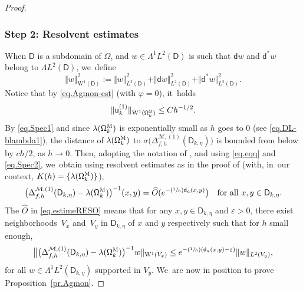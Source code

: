 \documentclass[JEP,XML,SOM,Unicode,NoEqCountersInSection,NoFloatCountersInSection,published]{cedram}
\newcommand{\Psfrac}[2]{(\sfrac{#1}{#2})}
\let\epsilon\varepsilon
\theoremstyle{plain}
\theoremstyle{definition}
\begin{document}
\begin{proof}
\subsubsection*{Step 2: Resolvent estimates}
When $\mathsf D$ is a subdomain of $\Omega$, and $w\in \Lambda^1L^2(\mathsf D)$ is such that $ \mathsf d w$ and $\mathsf d^* w$ belong to $\Lambda L^2(\mathsf D)$, we~define
\begin{equation}\label{eq.norm1}
\Vert w\Vert _{\mathrm W^1(\mathsf D)}^2:= \Vert w\Vert _{L^2(\mathsf D)}^2+\Vert \mathsf dw\Vert _{L^2(\mathsf D)}^2+\Vert \mathsf d^*w\Vert _{L^2(\mathsf D)}^2.
\end{equation}
Notice that by \eqref{eq.Agmon-est} (with $\varphi=0$), it~holds
\begin{equation}\label{eq.estimeW1}
\Vert \mathsf u^{(1)}_k \Vert _{\mathrm W^1(\mathsf \Omega_k^{\textsc{M}})}\le Ch^{-1/2}.
\end{equation}
By \eqref{eq.Spec1} and since $\lambda(\mathsf \Omega_k^{\textsc{M}})$ is exponentially small as $h$ goes to $0$ (see \eqref{eq.DL-blambda1}), the distance of $\lambda(\mathsf \Omega_k^{\textsc{M}})$ to $\sigma \bigl(\Delta_{f,h}^{ \mathcal M,(1)} (\mathsf D_{k,\eta})\bigr)$ is bounded from below by $ch/2$, as $h\to 0$.
Then, adopting the notation of
\cite[p.\,56]{DiSj}, and using \eqref{eq.eqq} and \eqref{eq.Spec2}, we~obtain using resolvent estimates as in the proof of
\cite[Prop.\,6.5]{DiSj} (with, in~our context, $K(h)=
\{\lambda(\mathsf \Omega_k^{\textsc{M}}) \}$),
\begin{equation}\label{eq.estimeRESO}
\bigl(\Delta_{f,h}^{ \mathcal M,(1)} (\mathsf D_{k,\eta})- \lambda(\mathsf \Omega_k^{\textsc{M}}) \bigr)^{-1}(x,y)= \widehat O(e^{-\Psfrac 1h \mathsf d_a(x,y)}\bigr) \quad\text{for all } x,y \in \mathsf D_{k,\eta}.
\end{equation}
The $\widehat O$ in \eqref{eq.estimeRESO} means that for any $x,y\in \mathsf D_{k,\eta}$ and $\epsilon>0$, there exist neighborhoods~$V_x$ and~$V_y$ in $\mathsf D_{k,\eta}$ of $x$ and $y$ respectively such that for $h$ small enough,
\[
\big \Vert \bigl(\Delta_{f,h}^{ \mathcal M,(1)} (\mathsf D_{k,\eta})- \lambda(\mathsf \Omega_k^{\textsc{M}}) \bigr)^{-1}w\Vert_{\mathrm W^1(V_x)}\le e^{-\Psfrac 1h (\mathsf d_a(x,y)-\epsilon)}\Vert w\Vert_{L^2(V_y)},
\]
for all $w\!\in\! \Lambda^1L^2(\mathsf D_{k,\eta})$ supported in $V_y$. We~are now in position to prove Proposition~\ref{pr.Agmon}.


\end{proof}
\end{document}
